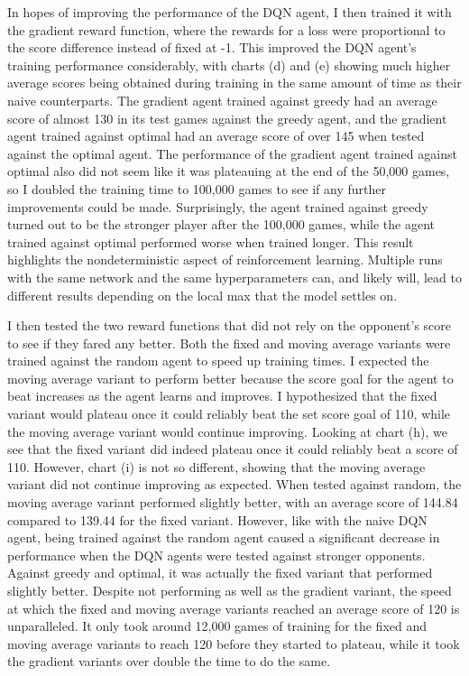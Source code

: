 \documentclass[12pt]{article}
\begin{document}
In hopes of improving the performance of the DQN agent, I then trained it with the gradient reward function, where the rewards for a loss were proportional to the score difference instead of fixed at -1. This improved the DQN agent's training performance considerably, with charts (d) and (e) showing much higher average scores being obtained during training in the same amount of time as their naive counterparts. The gradient agent trained against greedy had an average score of almost 130 in its test games against the greedy agent, and the gradient agent trained against optimal had an average score of over 145 when tested against the optimal agent. The performance of the gradient agent trained against optimal also did not seem like it was plateauing at the end of the 50,000 games, so I doubled the training time to 100,000 games to see if any further improvements could be made. Surprisingly, the agent trained against greedy turned out to be the stronger player after the 100,000 games, while the agent trained against optimal performed worse when trained longer. This result highlights the nondeterministic aspect of reinforcement learning. Multiple runs with the same network and the same hyperparameters can, and likely will, lead to different results depending on the local max that the model settles on.

I then tested the two reward functions that did not rely on the opponent's score to see if they fared any better. Both the fixed and moving average variants were trained against the random agent to speed up training times. I expected the moving average variant to perform better because the score goal for the agent to beat increases as the agent learns and improves. I hypothesized that the fixed variant would plateau once it could reliably beat the set score goal of 110, while the moving average variant would continue improving. Looking at chart (h), we see that the fixed variant did indeed plateau once it could reliably beat a score of 110. However, chart (i) is not so different, showing that the moving average variant did not continue improving as expected. When tested against random, the moving average variant performed slightly better, with an average score of 144.84 compared to 139.44 for the fixed variant. However, like with the naive DQN agent, being trained against the random agent caused a significant decrease in performance when the DQN agents were tested against stronger opponents. Against greedy and optimal, it was actually the fixed variant that performed slightly better. Despite not performing as well as the gradient variant, the speed at which the fixed and moving average variants reached an average score of 120 is unparalleled. It only took around 12,000 games of training for the fixed and moving average variants to reach 120 before they started to plateau, while it took the gradient variants over double the time to do the same.
\end{document}
